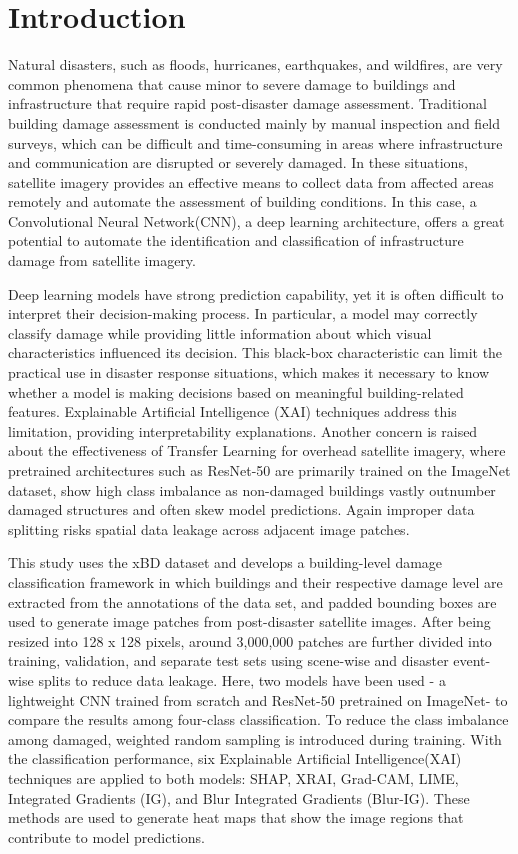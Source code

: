 \documentclass[conference]{IEEEtran}
\begin{document}
\section{Introduction}
 Natural disasters, such as floods, hurricanes, earthquakes, and wildfires, are very common phenomena that cause minor to severe damage to buildings and infrastructure that require rapid post-disaster damage assessment. Traditional building damage assessment is conducted mainly by manual inspection and field surveys, which can be difficult and time-consuming in areas where infrastructure and communication are disrupted or severely damaged. In these situations, satellite imagery provides an effective means to collect data from affected areas remotely and automate the assessment of building conditions. In this case, a Convolutional Neural Network(CNN), a deep learning architecture, offers a great potential to automate the identification and classification of infrastructure damage from satellite imagery.

Deep learning models have strong prediction capability, yet it is often difficult to interpret their decision-making process. In particular, a model may correctly classify damage while providing little information about which visual characteristics influenced its decision. This black-box characteristic can limit the practical use in disaster response situations, which makes it necessary to know whether a model is making decisions based on meaningful building-related features. Explainable Artificial Intelligence (XAI) techniques address this limitation, providing interpretability explanations. Another concern is raised about the effectiveness of Transfer Learning for overhead satellite imagery, where pretrained architectures such as ResNet-50 are primarily trained on the ImageNet dataset, show high class imbalance as non-damaged buildings vastly outnumber damaged structures and often skew model predictions. Again improper data splitting risks spatial data leakage across adjacent image patches.

This study uses the xBD dataset and develops a building-level damage classification framework in which buildings and their respective damage level are extracted from the annotations of the data set, and padded bounding boxes are used to generate image patches from post-disaster satellite images. After being resized into 128 x 128 pixels, around 3,000,000 patches are further divided into training, validation, and separate test sets using scene-wise and disaster event-wise splits to reduce data leakage.  Here, two models have been used - a lightweight CNN trained from scratch and ResNet-50 pretrained on ImageNet- to compare the results among four-class classification. To reduce the class imbalance among damaged, weighted random sampling is introduced during training. With the classification performance, six Explainable Artificial Intelligence(XAI) techniques are applied to both models: SHAP, XRAI, Grad-CAM, LIME, Integrated Gradients (IG), and Blur Integrated Gradients (Blur-IG). These methods are used to generate heat maps that show the image regions that contribute to model predictions.  
\end{document}
